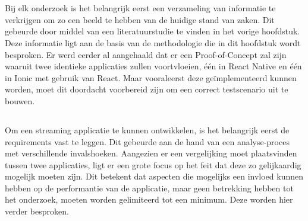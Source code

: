 
\chapter{}%
\label{ch:methodologie}


Bij elk onderzoek is het belangrijk eerst een verzameling van informatie te verkrijgen om zo een beeld te hebben van de huidige stand van zaken. Dit gebeurde door middel van een literatuurstudie te vinden in het vorige hoofdstuk. Deze informatie ligt aan de basis van de methodologie die in dit hoofdstuk wordt besproken. Er werd eerder al aangehaald dat er een Proof-of-Concept zal zijn waaruit twee identieke applicaties zullen voortvloeien, één in React Native en één in Ionic met gebruik van React. Maar vooraleerst deze geïmplementeerd kunnen worden, moet dit doordacht voorbereid zijn om een correct testscenario uit te bouwen.

\section{}%
\label{sec:requirements-analyse}

Om een streaming applicatie te kunnen ontwikkelen, is het belangrijk eerst de requirements vast te leggen. Dit gebeurde aan de hand van een analyse-proces met verschillende invalshoeken. Aangezien er een vergelijking moet plaatsvinden tussen twee applicaties, ligt er een grote focus op het feit dat deze zo gelijkaardig mogelijk moeten zijn. Dit betekent dat aspecten die mogelijks een invloed kunnen hebben op de performantie van de applicatie, maar geen betrekking hebben tot het onderzoek, moeten worden gelimiteerd tot een minimum. Deze worden hier verder besproken.


